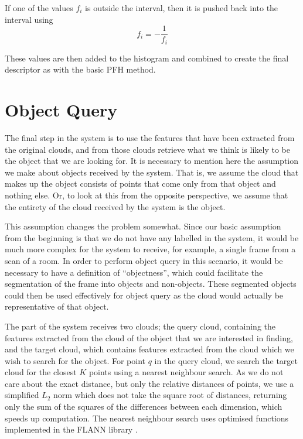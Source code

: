 \documentclass[11pt,a4paper]{kth-mag}
\begin{document}
If one of the values $f_i$ is outside the interval, then it is pushed back into
the interval using
\begin{equation}
  \label{eq:23}
  f_i=-\frac{1}{f_i}
\end{equation}

These values are then added to the histogram and combined to create the final
descriptor as with the basic PFH method.

\chapter{Object Query}
\label{chap:query}
The final step in the system is to use the features that have been extracted
from the original clouds, and from those clouds retrieve what we think is likely
to be the object that we are looking for. It is necessary to mention here the
assumption we make about objects received by the system. That is, we assume the
cloud that makes up the object consists of points that come only from that
object and nothing else. Or, to look at this from the opposite perspective, we
assume that the entirety of the cloud received by the system is the object.

This assumption changes the problem somewhat. Since our basic assumption from
the beginning is that we do not have any labelled in the system, it would be
much more complex for the system to receive, for example, a single frame from
a scan of a room. In order to perform object query in this scenario, it would be
necessary to have a definition of ``objectness'', which could facilitate the
segmentation of the frame into objects and non-objects. These segmented objects
could then be used effectively for object query as the cloud would actually be
representative of that object.

The part of the system receives two clouds; the query cloud, containing the
features extracted from the cloud of the object that we are interested in
finding, and the target cloud, which contains features extracted from the cloud
which we wish to search for the object. For point $q$ in the query cloud, we
search the target cloud for the closest $K$ points using a nearest neighbour
search. As we do not care about the exact distance, but only the relative
distances of points, we use a simplified $L_2$ norm which does not take the
square root of distances, returning only the sum of the squares of the
differences between each dimension, which speeds up computation. The nearest
neighbour search uses optimised functions implemented in the FLANN library
\cite{muja2009fast, muja2014scalable}.
\end{document}

